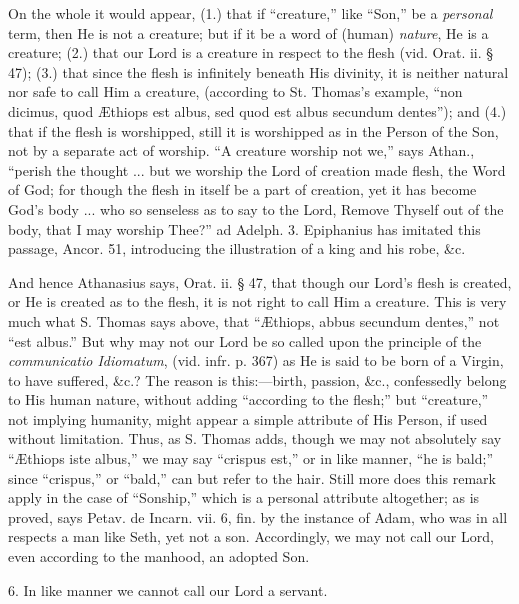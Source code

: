 On the whole it would appear, (1.) that if ``creature,''
like ``Son,'' be a \emph{personal} term, then He is not a creature; but
if it be a word of (human) \emph{nature}, He is a creature; (2.) that
our Lord is a creature in respect to the flesh (vid. Orat. ii. § 47);
(3.) that since the flesh is infinitely beneath His divinity, it is
neither natural nor safe to call Him a creature, (according to St.
Thomas's example, ``non dicimus, quod Æthiops est albus, sed quod est
albus secundum dentes''); and (4.) that if the flesh is worshipped,
still it is worshipped as in the Person of the Son, not by a separate
act of worship. ``A creature worship not we,'' says Athan., ``perish the
thought ... but we worship the Lord of creation made flesh, the Word
of God; for though the flesh in itself be a part of creation, yet it
has become God's body ... who so senseless as to say to the Lord,
Remove Thyself out of the body, that I may worship Thee?'' ad Adelph.
3. Epiphanius has imitated this passage, Ancor. 51, introducing the
illustration of a king and his robe, \&c.

And hence Athanasius says, Orat. ii. § 47, that
though our Lord's flesh is created, or He is created as to the flesh,
it is not right to call Him a creature. This is very much what S.
Thomas says above, that ``Æthiops, abbus secundum dentes,'' not ``est
albus.'' But why may not our Lord be so called upon the principle of
the \emph{communicatio Idiomatum}, (vid. infr. p. 367) as He is
said to be born of a Virgin, to have suffered, \&c.? The reason is
this:—birth, passion, \&c., confessedly belong to His human
nature, without adding ``according to the flesh;'' but ``creature,'' not
implying humanity, might appear a simple attribute of His Person, if
used without limitation. Thus, as S. Thomas adds, though we may not
absolutely say ``Æthiops iste albus,'' we may say ``crispus est,'' or in
like manner, ``he is bald;'' since ``crispus,'' or ``bald,'' can but refer
to the hair. Still more does this remark apply in the case of ``Sonship,''
which is a personal attribute altogether; as is proved, says Petav. de
Incarn. vii. 6, fin. by the instance of Adam, who was in all respects
a man like Seth, yet not a son. Accordingly, we may not call our Lord,
even according to the manhood, an adopted Son.

6. In like manner we cannot call our Lord a
servant.

